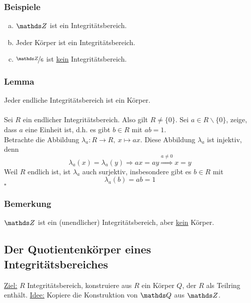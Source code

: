 \subsubsection*{Beispiele}
\begin{enumerate}[(a)]
	\item $\Z$ ist ein Integritätsbereich.
	\item Jeder Körper ist ein Integritätsbereich.
	\item $\nicefrac{\Z}{6}$ ist \uline{kein} Integritätsbereich.
\end{enumerate}

\subsubsection*{Lemma}
Jeder endliche Integritätsbereich ist ein Körper.\\

\\
Sei $R$ ein endlicher Integritätsbereich.
Also gilt $R\neq \{0\}$.
Sei $a\in R\backslash \{0\}$, zeige, dass $a$ eine Einheit ist, d.h. es gibt $b\in R$ mit $ab=1$.\\
Betrachte die Abbildung $\lambda_a:R\to R,~x\mapsto ax$.
Diese Abbildung $\lambda_a$ ist injektiv, denn 
\[
\lambda_a(x)=\lambda_a(y)\Rightarrow ax=ay\stackrel{a\neq 0}{\Rightarrow} x=y
\]
Weil $R$ endlich ist, ist $\lambda_a$ auch surjektiv, insbesondere gibt es $b\in R$ mit
\[
\lambda_a(b)=ab=1
\]
\hfill $\square$
\subsubsection*{Bemerkung}
$\Z$ ist ein (unendlicher) Integritätsbereich, aber \uline{kein} Körper.

\subsection{Der Quotientenkörper eines Integritätsbereiches}
\label{sub:quotientenkoerper}
\uline{Ziel:} $R$ Integritätsbereich, konstruiere aus $R$ ein Körper $Q$, der $R$ als Teilring enthält.
\uline{Idee:} Kopiere die Konstruktion von $\Q$ aus $\Z$.\\

